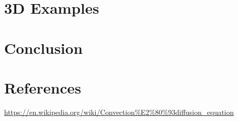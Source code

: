 \documentclass{tufte-handout}\usepackage[]{graphicx}\usepackage[]{xcolor}
\begin{document}
\section{3D Examples}

\section{Conclusion}



\newpage

\section{References}


\url{https://en.wikipedia.org/wiki/Convection%E2%80%93diffusion_equation}




\end{document}
